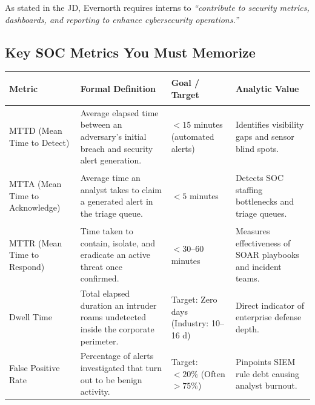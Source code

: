 \documentclass[10pt,a4paper]{article}
\begin{document}
As stated in the JD, Evernorth requires interns to \textit{``contribute to security metrics, dashboards, and reporting to enhance cybersecurity operations.''}

\subsection{Key SOC Metrics You Must Memorize}
\begin{table}[h!]
\centering
\small
\begin{tabularx}{\textwidth}{>{\bfseries\raggedright\arraybackslash}p{2.8cm} >{\raggedright\arraybackslash}X >{\raggedright\arraybackslash}p{3.2cm} >{\raggedright\arraybackslash}X}
\toprule
\textbf{Metric} & \textbf{Formal Definition} & \textbf{Goal / Target} & \textbf{Analytic Value} \\
\midrule
MTTD \newline \textmd{\scriptsize(Mean Time to Detect)} & Average elapsed time between an adversary's initial breach and security alert generation. & $< 15$ minutes \newline (automated alerts) & Identifies visibility gaps and sensor blind spots. \\
\addlinespace
MTTA \newline \textmd{\scriptsize(Mean Time to Acknowledge)} & Average time an analyst takes to claim a generated alert in the triage queue. & $< 5$ minutes & Detects SOC staffing bottlenecks and triage queues. \\
\addlinespace
MTTR \newline \textmd{\scriptsize(Mean Time to Respond)} & Time taken to contain, isolate, and eradicate an active threat once confirmed. & $< 30$--$60$ minutes & Measures effectiveness of SOAR playbooks and incident teams. \\
\addlinespace
Dwell Time & Total elapsed duration an intruder roams undetected inside the corporate perimeter. & Target: Zero days \newline (Industry: 10--16 d) & Direct indicator of enterprise defense depth. \\
\addlinespace
False Positive Rate & Percentage of alerts investigated that turn out to be benign activity. & Target: $< 20\%$ \newline (Often $> 75\%$) & Pinpoints SIEM rule debt causing analyst burnout. \\
\bottomrule
\end{tabularx}
\end{table}
\end{document}
